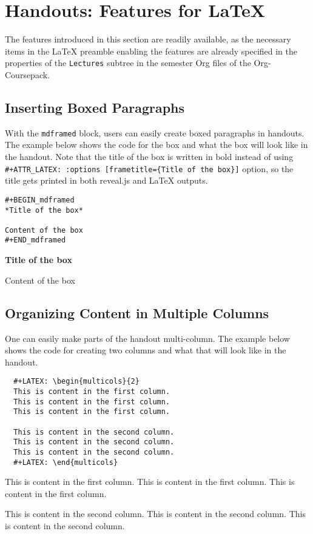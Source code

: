 \documentclass[10pt,article]{article}
\begin{document}
\section{Handouts: Features for \LaTeX{}}
\label{sec:orgfc76de7}
The features introduced in this section are readily available, as the
necessary items in the \LaTeX{} preamble enabling the features are already
specified in the properties of the \texttt{Lectures} subtree in the semester Org
files of the Org-Coursepack.
\subsection{Inserting Boxed Paragraphs}
\label{sec:orge9be1e0}
With the \texttt{mdframed} block, users can easily create boxed paragraphs in
handouts. The example below shows the code for the box and what the box will
look like in the handout. Note that the title of the box is written in bold
instead of using \texttt{\#+ATTR\_LATEX: :options [frametitle=\{Title of the box\}]}
option, so the title gets printed in both reveal.js and \LaTeX{} outputs.

\begin{verbatim}
#+BEGIN_mdframed
*Title of the box*

Content of the box
#+END_mdframed
\end{verbatim}

\begin{mdframed}
\textbf{Title of the box}

Content of the box
\end{mdframed}
\subsection{Organizing Content in Multiple Columns}
\label{sec:org74a0848}
One can easily make parts of the handout multi-column. The example
below shows the code for creating two columns and what that will look like in
the handout.

\begin{verbatim}
  #+LATEX: \begin{multicols}{2}
  This is content in the first column.
  This is content in the first column.
  This is content in the first column.

  This is content in the second column.
  This is content in the second column.
  This is content in the second column.
  #+LATEX: \end{multicols}
\end{verbatim}

\begin{multicols}{2}
This is content in the first column.
This is content in the first column.
This is content in the first column.

This is content in the second column.
This is content in the second column.
This is content in the second column.
\end{multicols}
\end{document}
